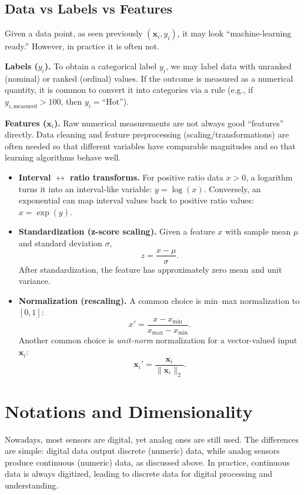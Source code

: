 \documentclass[12pt]{article}
\begin{document}
\subsection{Data vs Labels vs Features}
Given a data point, as seen previously $(\bm{x}_i,y_i)$, it may look ``machine-learning ready.'' However, in practice it is often not.

\textbf{Labels ($y_i$).} To obtain a categorical label $y_i$, we may label data with unranked (nominal) or ranked (ordinal) values. If the outcome is measured as a numerical quantity, it is common to convert it into categories via a rule (e.g., if $y_{i,\text{measured}} > 100$, then $y_i = \text{``Hot''}$).

\textbf{Features ($\bm{x}_i$).} Raw numerical measurements are not always good ``features'' directly. Data cleaning and feature preprocessing (scaling/transformations) are often needed so that different variables have comparable magnitudes and so that learning algorithms behave well.

\begin{itemize}
    \item \textbf{Interval $\leftrightarrow$ ratio transforms.} For positive ratio data $x>0$, a logarithm turns it into an interval-like variable: $y=\log(x)$. Conversely, an exponential can map interval values back to positive ratio values: $x=\exp(y)$.

    \item \textbf{Standardization (z-score scaling).} Given a feature $x$ with sample mean $\mu$ and standard deviation $\sigma$,
    \[
    z = \frac{x-\mu}{\sigma}.
    \]
    After standardization, the feature has approximately zero mean and unit variance.

    \item \textbf{Normalization (rescaling).} A common choice is min--max normalization to $[0,1]$:
    \[
    x' = \frac{x-x_{\min}}{x_{\max}-x_{\min}}.
    \]
    Another common choice is \textit{unit-norm} normalization for a vector-valued input $\bm{x}_i$:
    \[
    \bm{x}_i' = \frac{\bm{x}_i}{\lVert \bm{x}_i \rVert_2}.
    \]
\end{itemize}

\section{Notations and Dimensionality}
Nowadays, most sensors are digital, yet analog ones are still used. The differences are simple: digital data output discrete (numeric) data, while analog sensors produce continuous (numeric) data, as discussed above. In practice, continuous data is always digitized, leading to discrete data for digital processing and understanding. 
\end{document}
